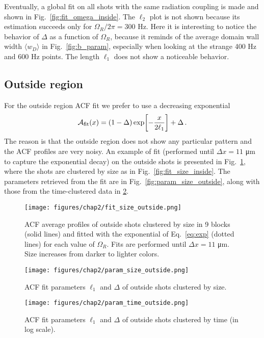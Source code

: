 Eventually, a global fit on all shots with the same radiation coupling is made and shown in Fig.\ \ref{fig:fit_omega_inside}. The $\ell_2$ plot is not shown because its estimation succeeds only for $\Omega_R/2\pi = 300$ \unit{\hertz}. Here it is interesting to notice the behavior of $\Delta$ as a function of $\Omega_R$, because it reminds of the average domain wall width $\langle w_D \rangle$ in Fig.\ \ref{fig:b_param}, especially when looking at the strange 400 Hz and 600 Hz points. The length $\ell_1$ does not show a noticeable behavior.

\subsection{Outside region}
For the outside region ACF fit we prefer to use a decreasing exponential
\begin{equation}
    \mathcal{A}_{\rm fit}(x) = (1-\Delta)\exp[-\frac{x}{2\ell_1}] + \Delta\, .
    \label{eq:exp}
\end{equation}
The reason is that the outside region does not show any particular pattern and the ACF profiles are very noisy.
An example of fit (performed until $\Delta x = 11$ \unit{\micro\meter} to capture the exponential decay) on the outside shots is presented in Fig.\ \ref{fig:fit_size_outside}, where the shots are clustered by size as in Fig.\ \ref{fig:fit_size_inside}. The parameters retrieved from the fit are in Fig.\ \ref{fig:param_size_outside}, along with those from the time-clustered data in \ref{fig:param_time_outside}. 
\begin{figure}[ht!]
    \centering
    \texttt{[image: figures/chap2/fit\_size\_outside.png]}
    \caption{ACF average profiles of outside shots clustered by size in 9 blocks (solid lines) and fitted with the exponential of Eq.\ \eqref{eq:exp} (dotted lines) for each value of $\Omega_R$. Fits are performed until $\Delta x = 11$ \unit{\micro\meter}. Size increases from darker to lighter colors.}
    \label{fig:fit_size_outside}
\end{figure}
\begin{figure}[ht!]
    \centering
    \begin{minipage}[t]{0.47 \textwidth}
        \centering
        \texttt{[image: figures/chap2/param\_size\_outside.png]}
        \caption{ACF fit parameters $\ell_1$ and $\Delta$ of outside shots clustered by size.}
        \label{fig:param_size_outside}
    \end{minipage}
    \hspace{0.02\textwidth}
    \begin{minipage}[t]{0.47 \textwidth}
        \centering
        \texttt{[image: figures/chap2/param\_time\_outside.png]}
        \caption{ACF fit parameters $\ell_1$ and $\Delta$ of outside shots clustered by time (in log scale).}
        \label{fig:param_time_outside}
    \end{minipage}
\end{figure}
